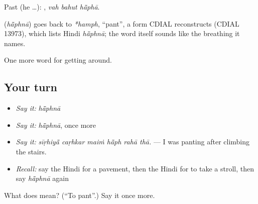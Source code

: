 Past (he …):   , \emph{vah bahut hā̃phā}.

\begin{cousinweb}
\textbf{} (\emph{hā̃phnā}) goes back to \emph{*hamph}, \textquotedblleft{}pant\textquotedblright{}, a form CDIAL reconstructs (CDIAL 13973), which lists Hindi \emph{hā̃phnā}; the word itself sounds like the breathing it names.
\end{cousinweb}

\begin{grammarlens}[title={What you've built}]
One more word for getting around.
\end{grammarlens}

\subsection*{Your turn}
\begin{itemize}
\raggedright
  \item \emph{Say it:} \emph{hā̃phnā}
  \item \emph{Say it:} \emph{hā̃phnā}, once more
  \item \emph{Say it:} \emph{sīṛhiyā̃ caṛhkar maiṁ hā̃ph rahā thā.} — I was panting after climbing the stairs.
  \item \emph{Recall:} say the Hindi for a pavement, then the Hindi for to take a stroll, then say \emph{hā̃phnā} again
\end{itemize}

\begin{tcolorbox}[breakable,colback=teal!4,colframe=teal!35!black,title={Before you move on}]
What does  mean? (\textquotedblleft{}To pant\textquotedblright{}.) Say it once more.
\end{tcolorbox}
